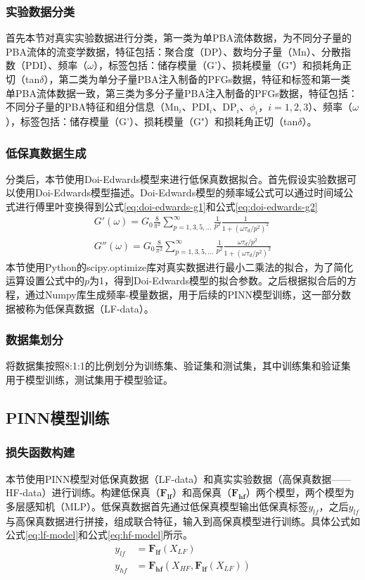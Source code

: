 \subsubsection{实验数据分类}
首先本节对真实实验数据进行分类，第一类为单PBA流体数据，为不同分子量的PBA流体的流变学数据，特征包括：聚合度（DP）、数均分子量（Mn）、分散指数（PDI）、频率（$\omega$），标签包括：储存模量（G'）、损耗模量（G"）和损耗角正切（tan$\delta$），第二类为单分子量PBA注入制备的PFGs数据，特征和标签和第一类单PBA流体数据一致，第三类为多分子量PBA注入制备的PFGs数据，特征包括：不同分子量的PBA特征和组分信息（Mn$_i$、PDI$_i$、DP$_i$、$\phi_i$，$i=1,2,3$）、频率（$\omega$），标签包括：储存模量（G'）、损耗模量（G"）和损耗角正切（tan$\delta$）。

\subsubsection{低保真数据生成}
分类后，本节使用Doi-Edwards模型来进行低保真数据拟合。首先假设实验数据可以使用Doi-Edwards模型描述。Doi-Edwards模型的频率域公式可以通过时间域公式进行傅里叶变换得到公式\eqref{eq:doi-edwards-g1}和公式\eqref{eq:doi-edwards-g2}
\begin{align}
  G'(\omega) = G_0 \frac{8}{\pi^2} \sum_{p=1,3,5,\ldots}^{\infty} \frac{1}{p^2} \frac{1}{1 + (\omega \tau_d / p^2)^2} \label{eq:doi-edwards-g1} \\
  G''(\omega) = G_0 \frac{8}{\pi^2} \sum_{p=1,3,5,\ldots}^{\infty} \frac{1}{p^2} \frac{\omega \tau_d / p^2}{1 + (\omega \tau_d / p^2)^2}
  \label{eq:doi-edwards-g2}
\end{align}
本节使用Python的scipy.optimize库对真实数据进行最小二乘法的拟合，为了简化运算设置公式中的$p$为1，得到Doi-Edwards模型的拟合参数。之后根据拟合后的方程，通过Numpy库生成频率-模量数据，用于后续的PINN模型训练，这一部分数据被称为低保真数据（LF-data）。

\subsubsection{数据集划分}
将数据集按照8:1:1的比例划分为训练集、验证集和测试集，其中训练集和验证集用于模型训练，测试集用于模型验证。
\subsection{PINN模型训练}
\subsubsection{损失函数构建}
本节使用PINN模型对低保真数据（LF-data）和真实实验数据（高保真数据——HF-data）进行训练。构建低保真（$\mathbf{F_{lf}}$）和高保真（$\mathbf{F_{hf}}$）两个模型，两个模型为多层感知机（MLP）。低保真数据首先通过低保真模型输出低保真标签$y_{lf}$，之后$y_{lf}$与高保真数据进行拼接，组成联合特征，输入到高保真模型进行训练。具体公式如公式\eqref{eq:lf-model}和公式\eqref{eq:hf-model}所示。
\begin{align}
  y_{lf} & = \mathbf{F_{lf}}(X_{LF}) \label{eq:lf-model}                          \\
  y_{hf} & = \mathbf{F_{hf}}(X_{HF}, \mathbf{F_{lf}}(X_{LF})) \label{eq:hf-model}
\end{align}

